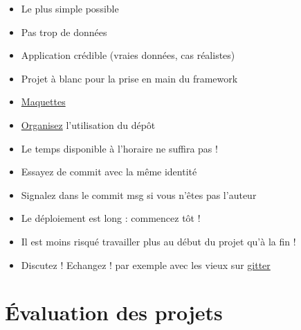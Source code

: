 \begin{itemize}
\tightlist
\item
  Le plus simple possible
\item
  Pas trop de données
\item
  Application crédible (vraies données, cas réalistes)
\item
  Projet à blanc pour la prise en main du framework
\item
  \href{https://brainhub.eu/blog/difference-between-wireframe-mockup-prototype/}{Maquettes}
\item
  \href{http://drewfradette.ca/a-simpler-successful-git-branching-model/}{Organisez}
  l'utilisation du dépôt
\item
  Le temps disponible à l'horaire ne suffira pas !
\item
  Essayez de commit avec la même identité
\item
  Signalez dans le commit msg si vous n'êtes pas l'auteur
\item
  Le déploiement est long : commencez tôt !
\item
  Il est moins risqué travailler plus au début du projet qu'à la fin !
\item
  Discutez ! Echangez ! par exemple avec les vieux sur
  \href{https://gitter.im/HE-Arc}{gitter}
\end{itemize}

\hypertarget{uxe9valuation-des-projets}{%
\section{Évaluation des projets}\label{uxe9valuation-des-projets}}

